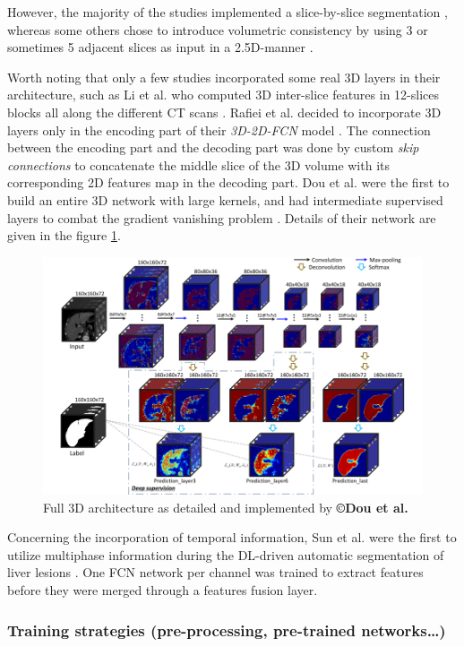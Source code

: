 \documentclass[]{article}
\begin{document}
	However, the majority of the studies implemented a slice-by-slice
	segmentation \cite{Chlebus2018, Kaluva2018, Bi2017}, whereas some others chose to introduce volumetric
	consistency by using 3 or sometimes 5 adjacent slices as input in a
	2.5D-manner \cite{Han2017, Yuan2017, Bellver2017}.
	
	
	Worth noting that only a few studies incorporated some real 3D layers in
	their architecture, such as Li et al. who computed 3D
	inter-slice features in 12-slices blocks all along the different CT
	scans \cite{Li2018}. Rafiei et al. decided to incorporate 3D layers only in
	the encoding part of their \emph{3D-2D-FCN} model \cite{Rafiei2018}. The connection
	between the encoding part and the decoding part was done by custom
	\emph{skip connections} to concatenate the middle slice of the 3D volume
	with its corresponding 2D features map in the decoding part. Dou
	et al. were the first to build an entire 3D network with large kernels,
	and had intermediate supervised layers to combat the gradient vanishing
	problem \cite{Dou2016}. Details of their network are given in the figure \ref{Dou2016_3Darchitecture}.
	
	\begin{figure}[th!]
		\centering
		\includegraphics[width=0.7\linewidth]{images/image30}
		\caption{Full 3D architecture as detailed and implemented by \textbf{©Dou et al.} \cite{Dou2016}}
		\label{Dou2016_3Darchitecture}
	\end{figure}
	
	Concerning the incorporation of temporal information, Sun et
	al. were the first to utilize multiphase information during the
	DL-driven automatic segmentation of liver lesions \cite{Sun2017}. One FCN network per
	channel was trained to extract features before they were merged through
	a features fusion layer.
	
	\subsubsection*{Training strategies (pre-processing, pre-trained networks\ldots{})}
	
\end{document}
